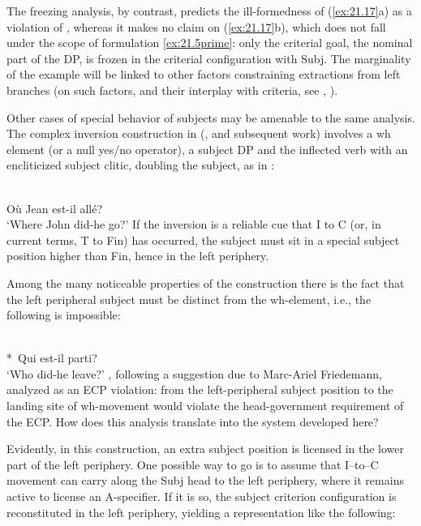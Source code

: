 \documentclass[output=paper]{langsci/langscibook}
\begin{document}
\begin{exe}
The freezing analysis, by contrast, predicts the ill-formedness of
(\ref{ex:21.17}a) as a violation of , whereas it
makes no claim on (\ref{ex:21.17}b), which does not fall under the scope of
formulation  \eqref{ex:21.5prime}: only the criterial goal, the nominal
part of the DP, is frozen in the criterial configuration with Subj\tss{[$+$N]}.
The marginality of the example will be linked to other factors constraining
extractions from left branches (on such factors, and their interplay with
criteria, see \citealt{Lohndal2010}, \citealt{Berthelot2017}).

Other cases of special behavior of subjects may be amenable to the same
analysis. The complex inversion construction in 
(\citealt{Kayne1972,RizziRoberts1989}, and subsequent work) involves a wh
element (or a null yes/no operator), a subject DP and the inflected verb with
an encliticized subject clitic, doubling the subject, as in :

\ea%
    \label{ex:21.18}\\
    Où        Jean est-il allé?\\
         ‘Where John did-he go?’
\z
%
If the inversion is a reliable cue that I to C (or, in current terms, T to Fin)
has occurred, the subject must sit in a special subject position higher than
Fin, hence in the left periphery.

Among the many noticeable properties of the construction there is the fact that
the left peripheral subject must be distinct from the wh-element, i.e., the
following is impossible:

\ea%
    \label{ex:21.19}\\
    *~Qui    est-il  parti?\\
    \hphantom{*~}‘Who did-he leave?’
\z
%
\textcite{RizziRoberts1989}, following a suggestion due to Marc-Ariel
Friedemann, analyzed  as an \gls{ECP} violation:  from the left-peripheral subject position
to the landing site of wh-movement would violate the head-government
requirement of the \gls{ECP}. How does this analysis translate into the system
developed here?

Evidently, in this construction, an extra subject position is licensed in the
lower part of the left periphery. One possible way to go is to assume that
I--to--C movement can carry along the Subj head to the left periphery, where it
remains active to license an A-specifier. If it is so, the subject criterion
configuration is reconstituted in the left periphery, yielding a representation
like the following:


\end{exe}
\end{document}
